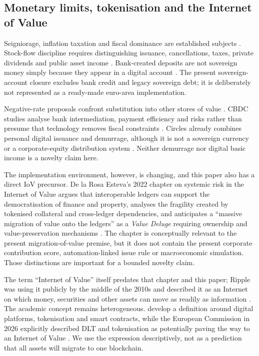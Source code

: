 \subsection{Monetary limits, tokenisation and the Internet of Value}
Seigniorage, inflation taxation and fiscal dominance are established subjects \citep{bailey1956,friedman1971,sargent1981,buiter2014}. Stock-flow discipline requires distinguishing issuance, cancellations, taxes, private dividends and public asset income \citep{godley2007}. Bank-created deposits are not sovereign money simply because they appear in a digital account \citep{mcleay2014}. The present sovereign-account closure excludes bank credit and legacy sovereign debt; it is deliberately not represented as a ready-made euro-area implementation.

Negative-rate proposals confront substitution into other stores of value \citep{agarwal2015}. CBDC studies analyse bank intermediation, payment efficiency and risks rather than presume that technology removes fiscal constraints \citep{auer2021,bidder2025,bindseil2025}. Circles already combines personal digital issuance and demurrage, although it is not a sovereign currency or a corporate-equity distribution system \citep{circles2026}. Neither demurrage nor digital basic income is a novelty claim here.

The implementation environment, however, is changing, and this paper also has a direct IoV precursor. De la Rosa Esteva's 2022 chapter on systemic risk in the Internet of Value argues that interoperable ledgers can support the democratisation of finance and property, analyses the fragility created by tokenised collateral and cross-ledger dependencies, and anticipates a ``massive migration of value onto the ledgers'' as a \emph{Value Deluge} requiring ownership and value-preservation mechanisms \citep{delarosa2022iov}. The chapter is conceptually relevant to the present migration-of-value premise, but it does not contain the present corporate contribution score, automation-linked issue rule or macroeconomic simulation. Those distinctions are important for a bounded novelty claim.

The term ``Internet of Value'' itself predates that chapter and this paper; Ripple was using it publicly by the middle of the 2010s and described it as an Internet on which money, securities and other assets can move as readily as information \citep{ripple2017}. The academic concept remains heterogeneous. \citet{lohmer2024} develop a definition around digital platforms, tokenisation and smart contracts, while the European Commission in 2026 explicitly described DLT and tokenisation as potentially paving the way to an Internet of Value \citep{eciov2026}. We use the expression descriptively, not as a prediction that all assets will migrate to one blockchain.

